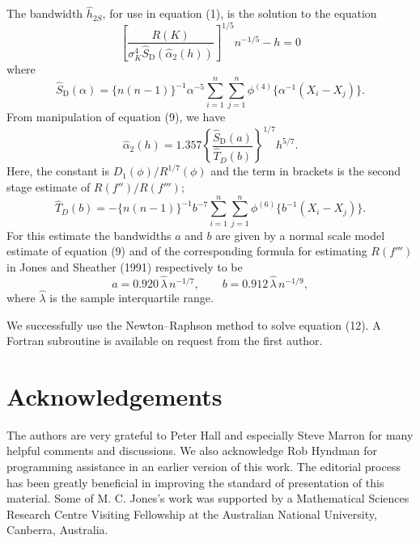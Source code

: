 \documentclass[11pt]{article}
\newcommand{\SD}{\widehat S_{\mathrm{D}}}
\begin{document}
The bandwidth $\widehat h_{2S}$, for use in equation (1), is the solution to the equation
\begin{equation}
\left[\frac{R(K)}{\sigma_K^4\SD(\widehat\alpha_2(h))}\right]^{1/5}n^{-1/5}-h=0
\tag{12}
\end{equation}
where
\begin{equation}
\SD(\alpha)=\{n(n-1)\}^{-1}\alpha^{-5}
\sum_{i=1}^n\sum_{j=1}^n \phi^{(4)}\{\alpha^{-1}(X_i-X_j)\}.
\end{equation}
From manipulation of equation (9), we have
\begin{equation}
\widehat\alpha_2(h)=1.357\left\{\frac{\SD(a)}{\widehat T_D(b)}\right\}^{1/7}h^{5/7}.
\end{equation}
Here, the constant is $D_1(\phi)/R^{1/7}(\phi)$ and the term in brackets is the second stage estimate of $R(f'')/R(f''')$;
\begin{equation}
\widehat T_D(b)=-\{n(n-1)\}^{-1}b^{-7}
\sum_{i=1}^n\sum_{j=1}^n \phi^{(6)}\{b^{-1}(X_i-X_j)\}.
\end{equation}
For this estimate the bandwidths $a$ and $b$ are given by a normal scale model estimate of equation (9) and of the corresponding formula for estimating $R(f''')$ in Jones and Sheather (1991) respectively to be
\begin{equation}
a=0.920\,\widehat\lambda\,n^{-1/7},
\qquad
b=0.912\,\widehat\lambda\,n^{-1/9},
\end{equation}
where $\widehat\lambda$ is the sample interquartile range.

We successfully use the Newton--Raphson method to solve equation (12). A Fortran subroutine is available on request from the first author.

\section*{Acknowledgements}
The authors are very grateful to Peter Hall and especially Steve Marron for many helpful comments and discussions. We also acknowledge Rob Hyndman for programming assistance in an earlier version of this work. The editorial process has been greatly beneficial in improving the standard of presentation of this material. Some of M. C. Jones's work was supported by a Mathematical Sciences Research Centre Visiting Fellowship at the Australian National University, Canberra, Australia.
\end{document}
